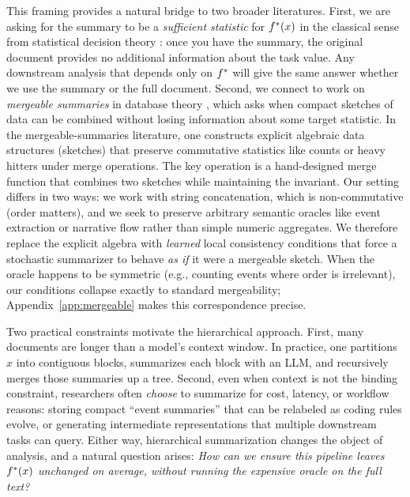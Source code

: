 This framing provides a natural bridge to two broader literatures. First, we are asking for the summary to be a \emph{sufficient statistic} for $f^{\ast}(x)$ in the classical sense from statistical decision theory \citep{Blackwell1953}: once you have the summary, the original document provides no additional information about the task value. Any downstream analysis that depends only on $f^{\ast}$ will give the same answer whether we use the summary or the full document. Second, we connect to work on \emph{mergeable summaries} in database theory \citep{agarwal2013mergeable}, which asks when compact sketches of data can be combined without losing information about some target statistic. In the mergeable-summaries literature, one constructs explicit algebraic data structures (sketches) that preserve commutative statistics like counts or heavy hitters under merge operations. The key operation is a hand-designed merge function that combines two sketches while maintaining the invariant. Our setting differs in two ways: we work with string concatenation, which is non-commutative (order matters), and we seek to preserve arbitrary semantic oracles like event extraction or narrative flow rather than simple numeric aggregates. We therefore replace the explicit algebra with \emph{learned} local consistency conditions that force a stochastic summarizer to behave \emph{as if} it were a mergeable sketch. When the oracle happens to be symmetric (e.g., counting events where order is irrelevant), our conditions collapse exactly to standard mergeability; Appendix~\ref{app:mergeable} makes this correspondence precise.

Two practical constraints motivate the hierarchical approach. First, many documents are longer than a model's context window. In practice, one partitions $x$ into contiguous blocks, summarizes each block with an LLM, and recursively merges those summaries up a tree. Second, even when context is not the binding constraint, researchers often \emph{choose} to summarize for cost, latency, or workflow reasons: storing compact ``event summaries'' that can be relabeled as coding rules evolve, or generating intermediate representations that multiple downstream tasks can query. Either way, hierarchical summarization changes the object of analysis, and a natural question arises: \emph{How can we ensure this pipeline leaves $f^{\ast}(x)$ unchanged on average, without running the expensive oracle on the full text?}

